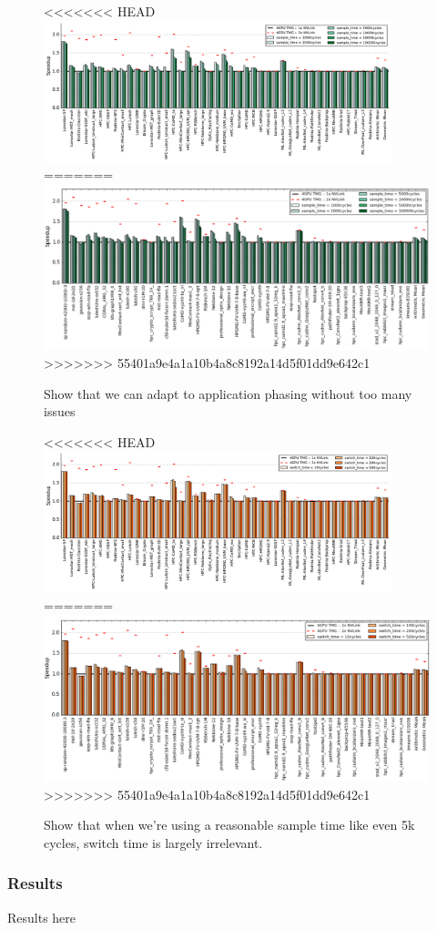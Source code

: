\begin{figure}[tp]
    \centering
<<<<<<< HEAD
    \includegraphics[width=0.9\textwidth]{figures/plot_nvlink_sample_time.pdf}
=======
    \includegraphics[width=1.0\textwidth]{figures/sample-time.jpg}
>>>>>>> 55401a9e4a1a10b4a8c8192a14d5f01dd9e642c1
    \caption{Show that we can adapt to application phasing without too many 
issues}
    \label{fig:sampletime}
\end{figure}


\begin{figure}[tp]
    \centering
<<<<<<< HEAD
    \includegraphics[width=0.9\textwidth]{figures/plot_nvlink_switch_time_sample_time5000.pdf}
=======
    \includegraphics[width=1.0\textwidth]{figures/switch-time.jpg}
>>>>>>> 55401a9e4a1a10b4a8c8192a14d5f01dd9e642c1
    \caption{Show that when we're using a reasonable sample time like even 5k 
cycles, switch time is largely irrelevant.}
    \label{fig:switchtime}
\end{figure}

\subsubsection{Results}
Results here